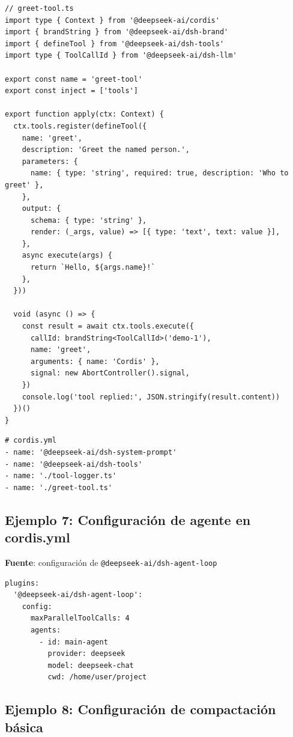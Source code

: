 \documentclass[11pt,a4paper]{article}
\begin{document}
\begin{lstlisting}
// greet-tool.ts
import type { Context } from '@deepseek-ai/cordis'
import { brandString } from '@deepseek-ai/dsh-brand'
import { defineTool } from '@deepseek-ai/dsh-tools'
import type { ToolCallId } from '@deepseek-ai/dsh-llm'

export const name = 'greet-tool'
export const inject = ['tools']

export function apply(ctx: Context) {
  ctx.tools.register(defineTool({
    name: 'greet',
    description: 'Greet the named person.',
    parameters: {
      name: { type: 'string', required: true, description: 'Who to greet' },
    },
    output: {
      schema: { type: 'string' },
      render: (_args, value) => [{ type: 'text', text: value }],
    },
    async execute(args) {
      return `Hello, ${args.name}!`
    },
  }))

  void (async () => {
    const result = await ctx.tools.execute({
      callId: brandString<ToolCallId>('demo-1'),
      name: 'greet',
      arguments: { name: 'Cordis' },
      signal: new AbortController().signal,
    })
    console.log('tool replied:', JSON.stringify(result.content))
  })()
}
\end{lstlisting}


\begin{lstlisting}
# cordis.yml
- name: '@deepseek-ai/dsh-system-prompt'
- name: '@deepseek-ai/dsh-tools'
- name: './tool-logger.ts'
- name: './greet-tool.ts'
\end{lstlisting}


\subsection*{Ejemplo 7: Configuración de agente en cordis.yml}


\textbf{Fuente}: configuración de \texttt{@deepseek-ai/dsh-agent-loop}


\begin{lstlisting}
plugins:
  '@deepseek-ai/dsh-agent-loop':
    config:
      maxParallelToolCalls: 4
      agents:
        - id: main-agent
          provider: deepseek
          model: deepseek-chat
          cwd: /home/user/project
\end{lstlisting}


\subsection*{Ejemplo 8: Configuración de compactación básica}
\end{document}

